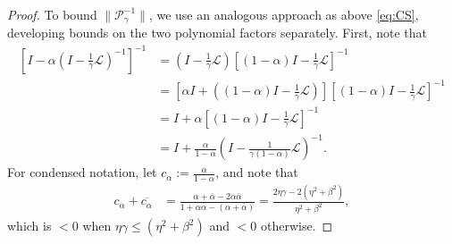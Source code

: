 \documentclass[review]{siamart}
\begin{document}
\begin{proof}
To bound $\|\mathcal{P}_\gamma^{-1}\|$, we use an analogous approach as above
\eqref{eq:CS}, developing bounds on the two polynomial factors separately.
First, note that
%
\begin{align}\nonumber
\left[I - \alpha\left(I - \tfrac{1}{\gamma}\mathcal{L}\right)^{-1}\right]^{-1}
	& = \left(I - \tfrac{1}{\gamma}\mathcal{L}\right)
		\left[(1-\alpha)I - \tfrac{1}{\gamma}\mathcal{L}\right]^{-1} \nonumber\\
& = \left[\alpha I + ((1-\alpha)I - \tfrac{1}{\gamma}\mathcal{L})\right]
		\left[(1-\alpha)I - \tfrac{1}{\gamma}\mathcal{L}\right]^{-1} \nonumber\\
& = I + \alpha \left[(1-\alpha)I - \tfrac{1}{\gamma}\mathcal{L}\right]^{-1} \nonumber\\
& = I + \frac{\alpha}{1-\alpha} \left(I - \tfrac{1}{\gamma(1-\alpha)}\mathcal{L}\right)^{-1}.
	\label{eq:inv_factor}
\end{align}
%
For condensed notation, let $c_\alpha := \tfrac{\alpha}{1-\alpha}$, and note that 
%
\begin{align*} 
c_\alpha+\overline{c_\alpha} & = \frac{\alpha + \overline{\alpha} - 2\alpha\overline{\alpha}}
	{1 + \alpha\overline{\alpha} - (\alpha + \overline{\alpha})} 
= \frac{2\eta\gamma - 2(\eta^2+\beta^2)}{\eta^2+\beta^2},
\end{align*}
%
which is $< 0$ when $\eta\gamma \leq (\eta^2+\beta^2)$ and $<0$ otherwise. 


\end{proof}
\end{document}
